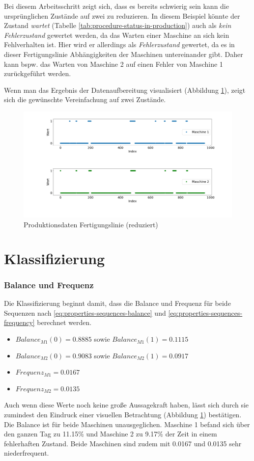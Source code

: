 Bei diesem Arbeitsschritt zeigt sich, dass es bereits schwierig sein kann die ursprünglichen Zustände auf zwei zu reduzieren. In diesem Beispiel könnte der Zustand \textit{wartet} (Tabelle \ref{tab:procedure-status-in-production}) auch als \textit{kein Fehlerzustand} gewertet werden, da das Warten einer Maschine an sich kein Fehlverhalten ist. Hier wird er allerdings als \textit{Fehlerzustand} gewertet, da es in dieser Fertigungslinie Abhängigkeiten der Maschinen untereinander gibt. Daher kann bspw. das Warten von Maschine 2 auf einen Fehler von  Maschine 1 zurückgeführt werden.

Wenn man das Ergebnis der Datenaufbereitung visualisiert (Abbildung \ref{fig:procedure-reduced-data}), zeigt sich die gewünschte Vereinfachung auf zwei Zustände.

\begin{figure}[H]
	\centering
	\includegraphics[scale=0.32]{images/procedure/reduced-data}
	\caption{Produktionsdaten Fertigungslinie (reduziert)}
	\label{fig:procedure-reduced-data}
\end{figure}

\section{Klassifizierung}
\label{sec:classification}
\subsubsection{Balance und Frequenz}

Die Klassifizierung beginnt damit, dass die Balance und Frequenz für beide Sequenzen nach \ref{eq:properties-sequences-balance} und \ref{eq:properties-sequences-frequency} berechnet werden.
\begin{itemize}
	\item $Balance_{M1}(0) = 0.8885$ sowie $Balance_{M1}(1) = 0.1115$
	\item $Balance_{M2}(0) = 0.9083$ sowie $Balance_{M2}(1) = 0.0917$
	\item $Frequenz_{M1} = 0.0167$
	\item $Frequenz_{M2} = 0.0135$
\end{itemize}
Auch wenn diese Werte noch keine große Aussagekraft haben, lässt sich durch sie zumindest den Eindruck einer visuellen Betrachtung (Abbildung \ref{fig:procedure-reduced-data}) bestätigen. Die Balance ist für beide Maschinen unausgeglichen. Maschine 1 befand sich über den ganzen Tag zu 11.15\% und Maschine 2 zu 9.17\% der Zeit in einem fehlerhaften Zustand. Beide Maschinen sind zudem mit 0.0167 und 0.0135 sehr niederfrequent.

